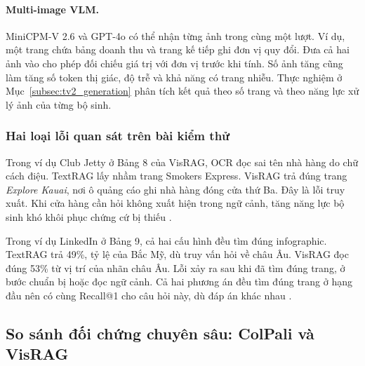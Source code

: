 \paragraph{Multi-image VLM.}
MiniCPM-V 2.6 và GPT-4o có thể nhận từng ảnh trong cùng một lượt.
Ví dụ, một trang chứa bảng doanh thu và trang kế tiếp ghi đơn
vị quy đổi. Đưa cả hai ảnh vào cho phép đối chiếu giá trị với đơn
vị trước khi tính. Số ảnh tăng cũng làm tăng số token thị giác,
độ trễ và khả năng có trang nhiễu. Thực nghiệm ở
Mục~\ref{subsec:tv2_generation} phân tích kết quả theo số trang
và theo năng lực xử lý ảnh của từng bộ sinh.

\subsubsection{Hai loại lỗi quan sát trên bài kiểm thử}

Trong ví dụ Club Jetty ở Bảng 8 của VisRAG, OCR đọc sai tên nhà
hàng do chữ cách điệu. TextRAG lấy nhầm trang Smokers Express.
VisRAG trả đúng trang \textit{Explore Kauai}, nơi ô quảng cáo ghi
nhà hàng đóng cửa thứ Ba. Đây là lỗi truy xuất. Khi cửa hàng cần
hỏi không xuất hiện trong ngữ cảnh, tăng năng lực bộ sinh khó
khôi phục chứng cứ bị thiếu \cite{yu2025visrag}.

Trong ví dụ LinkedIn ở Bảng 9, cả hai cấu hình đều tìm đúng
infographic. TextRAG trả 49\%, tỷ lệ của Bắc Mỹ, dù truy vấn hỏi
về châu Âu. VisRAG đọc đúng 53\% từ vị trí của nhãn châu Âu.
Lỗi xảy ra sau khi đã tìm đúng trang, ở bước chuẩn bị hoặc đọc
ngữ cảnh. Cả hai phương án đều tìm đúng trang ở hạng đầu nên có cùng
Recall@1 cho câu hỏi này, dù đáp án khác nhau \cite{yu2025visrag}.

\subsection{So sánh đối chứng chuyên sâu: ColPali và VisRAG}
\label{subsec:colpali_vs_visrag}



